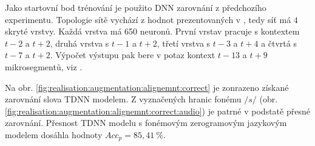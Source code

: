 Jako startovní bod trénování je použito DNN zarovnání z předchozího experimentu. Topologie sítě vychází z hodnot prezentovaných v \cite{Peddinti2015}, tedy síť má $4$ skryté vrstvy. Každá vrstva má 650 neuronů. První vrstav pracuje s kontextem $t-2$ a $t+2$, druhá vrstva s $t-1$ a $t+2$, třetí vrstva s $t-3$ a $t+4$ a čtvrtá s $t-7$ a $t+2$. Výpočet výstupu pak bere v potaz kontext $t-13$ a $t+9$ mikrosegmentů, viz \cite{Peddinti2015}.


Na obr. \ref{fig:realisation:augmentation:alignemnt:correct} je zonrazeno získané zarovnání slova  TDNN modelem. Z vyznačených hranic fonému $/s/$ (obr. \ref{fig:realisation:augmentation:alignemnt:correct:audio}) je patrné v podstatě přesné zarovnání. Přesnost TDNN modelu s fonémovým zerogramovým jazykovým modelem dosáhla hodnoty $Acc_{p}= 85,41\ \%$.

